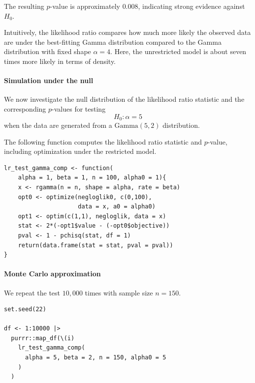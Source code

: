 The resulting $p$-value is approximately $0.008$, indicating strong evidence against $H_0$.

\begin{remark}
Intuitively, the likelihood ratio compares how much more likely the observed data are under the
best-fitting Gamma distribution compared to the Gamma distribution with fixed shape $\alpha=4$.
Here, the unrestricted model is about seven times more likely in terms of density.
\end{remark}

\begin{ex}
\end{ex}
    \paragraph{Simulation under the null}%
    
We now investigate the null distribution of the likelihood ratio statistic and the corresponding
$p$-values for testing
\[
H_0 : \alpha = 5
\]
when the data are generated from a $\mathrm{Gamma}(5,2)$ distribution.

\begin{definition}
The following function computes the likelihood ratio statistic and $p$-value, including optimization
under the restricted model.
\end{definition}

\begin{verbatim}
lr_test_gamma_comp <- function(
    alpha = 1, beta = 1, n = 100, alpha0 = 1){
    x <- rgamma(n = n, shape = alpha, rate = beta)
    opt0 <- optimize(negloglik0, c(0,100),
                     data = x, a0 = alpha0)
    opt1 <- optim(c(1,1), negloglik, data = x)
    stat <- 2*(-opt1$value - (-opt0$objective))
    pval <- 1 - pchisq(stat, df = 1)
    return(data.frame(stat = stat, pval = pval))
}
\end{verbatim}

\paragraph{Monte Carlo approximation}%

We repeat the test $10{,}000$ times with sample size $n=150$.

\begin{verbatim}
set.seed(22)

df <- 1:10000 |>
  purrr::map_df(\(i)
    lr_test_gamma_comp(
      alpha = 5, beta = 2, n = 150, alpha0 = 5
    )
  )
\end{verbatim}

